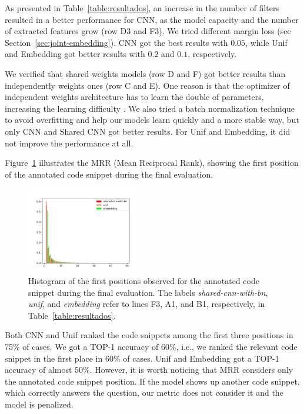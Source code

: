 \documentclass[sigconf]{acmart}
\begin{document}
As presented in Table~\ref{table:resultados}, an increase in the number of filters resulted in a better performance for CNN, as the model capacity and the number of extracted features grow (row D3 and F3). We tried different margin loss (see Section~\ref{sec:joint-embedding}). CNN got the best results with $0.05$, while Unif and Embedding got better results with $0.2$ and $0.1$, respectively. 

We verified that shared weights models (row D and F) got better results than independently weights ones (row C and E). One reason is that the optimizer of independent weights architecture has to learn the double of parameters, increasing the learning difficulty \cite{feng-2015}. We also tried a batch normalization technique to avoid overfitting and help our models learn quickly and a more stable way, but only CNN and Shared CNN got better results. For Unif and Embedding, it did not improve the performance at all. 

Figure~\ref{fig:histogram-mrr} illustrates the MRR (Mean Reciprocal Rank), showing the first position of the annotated code snippet during the final evaluation.

\begin{figure}[h]
    \centering
    \includegraphics[width=0.45\textwidth]{figuras/histogram.pdf}
    \caption{Histogram of the first positions observed for the annotated code snippet during the final evaluation. The labels \emph{shared-cnn-with-bn}, \emph{unif}, and \emph{embedding} refer to lines F3, A1, and B1, respectively, in Table~\ref{table:resultados}.}
    \label{fig:histogram-mrr}
\end{figure}

Both CNN and Unif ranked the code snippets among the first three positions in 75\% of cases. We got a TOP-1 accuracy of 60\%, i.e., we ranked the relevant code snippet in the first place in 60\% of cases. Unif and Embedding got a TOP-1 accuracy of almost 50\%. However, it is worth noticing that MRR considers only the annotated code snippet position. If the model shows up another code snippet, which correctly answers the question, our metric does not consider it and the model is penalized. 
\end{document}

